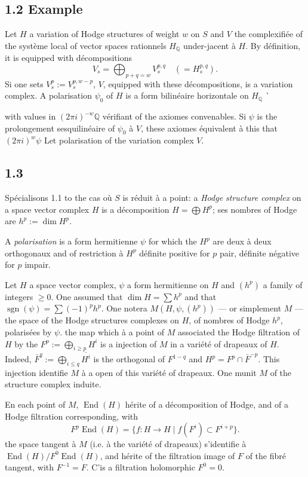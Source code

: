 \documentclass[12pt,a4paper]{article}
\theoremstyle{plain}
\theoremstyle{definition}
\DeclareMathOperator{\End}{End}
\DeclareMathOperator{\sgn}{sgn}
\newcommand{\QQ}{\mathbb{Q}}
\begin{document}
\subsection*{1.2 Example}
Let $H$ a variation of Hodge structures of weight $w$ on $S$ and $V$ the complexifi\'{e}e of the syst\`{e}me local of vector spaces rationnels $H_{\QQ}$ under-jacent \`{a} $H$. By d\'{e}finition, it is equipped with d\'{e}compositions
\[
V_{s} = \bigoplus_{p+q=w} V_{s}^{p,q} \quad (= H_{s}^{p,q}).
\]
Si one sets $V_{s}^{p} := V_{s}^{p,w-p}$, $V$, equipped with these d\'{e}compositions, is a variation complex. A polarisation $\psi_{0}$ of $H$ is a form bilin\'{e}aire horizontale on $H_{\QQ}$ \`{with values in $(2\pi i)^{-w}\QQ$ v\'{e}rifiant of the axiomes convenables. Si $\psi$ is the prolongement sesquilin\'{e}aire of $\psi_{0}$ \`{a} $V$, these axiomes \'{e}quivalent \`{a} this that $(2\pi i)^{w}\psi$ Let polarisation of the variation complex $V$.

\subsection*{1.3}
Sp\'{e}cialisons 1.1 to the cas o\`{u} $S$ is r\'{e}duit \`{a} a point: a \emph{Hodge structure complex} on a space vector complex $H$ is a d\'{e}composition $H = \bigoplus H^{p}$; ses nombres of Hodge are $h^{p} := \dim H^{p}$.

A \emph{polarisation} is a form hermitienne $\psi$ for which the $H^{p}$ are deux \`{a} deux orthogonaux and of restriction \`{a} $H^{p}$ d\'{e}finite positive for $p$ pair, d\'{e}finite n\'{e}gative for $p$ impair.

Let $H$ a space vector complex, $\psi$ a form hermitienne on $H$ and $(h^{p})$ a family of integers $\geq 0$. One assumed that $\dim H = \sum h^{p}$ and that $\sgn(\psi) = \sum (-1)^{p} h^{p}$. One notera $M(H, \psi, (h^{p}))$ --- or simplement $M$ --- the space of the Hodge structures complexes on $H$, of nombres of Hodge $h^{p}$, polaris\'{e}es by $\psi$. the map which \`{a} a point of $M$ associated the Hodge filtration of $H$ by the $F^{p} := \bigoplus_{i \geq p} H^{i}$ is a injection of $M$ in a vari\'{e}t\'{e} of drapeaux of $H$. Indeed, $\bar{F}^{q} := \bigoplus_{i \leq q} \overline{H^{i}}$ is the orthogonal of $F^{1-q}$ and $H^{p} = F^{p} \cap \bar{F}^{-p}$. This injection identifie $M$ \`{a} a open of this vari\'{e}t\'{e} of drapeaux. One munit $M$ of the structure complex induite.

En each point of $M$, $\End(H)$ h\'{e}rite of a d\'{e}composition of Hodge, and of a Hodge filtration corresponding, with
\[
F^{p}\End(H) = \{f : H \to H \mid f(F^{i}) \subset F^{i+p}\}.
\]
the space tangent \`{a} $M$ (i.e. \`{a} the vari\'{e}t\'{e} of drapeaux) s'identifie \`{a} $\End(H)/F^{0}\End(H)$, and h\'{e}rite of the filtration image of $F$ of the fibr\'{e} tangent, with $F^{-1} = F$. C'is a filtration holomorphic $F^{0} = 0$.

}
\end{document}
